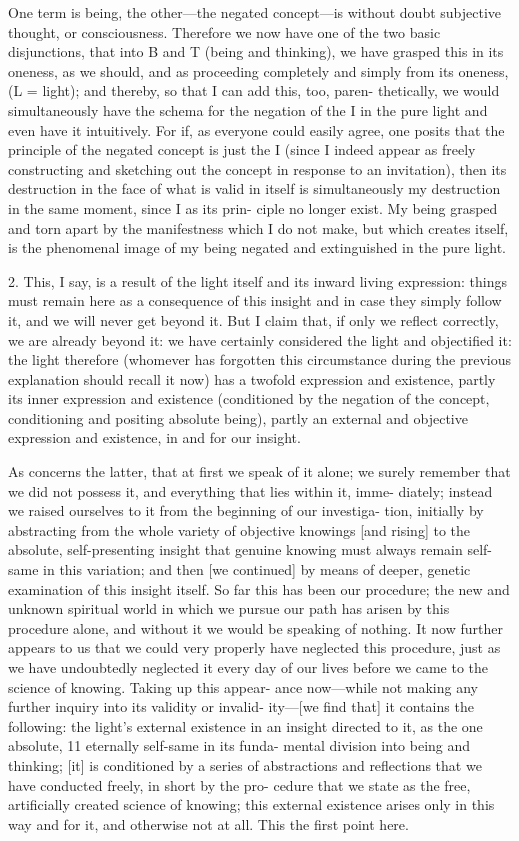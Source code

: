 One term is being, the other—the negated concept—is without doubt
subjective thought, or consciousness.
 Therefore we now have one of the two
basic disjunctions, that into B and T (being and thinking), we have grasped
this in its oneness, as we should, and as proceeding completely and simply
from its oneness, (L = light); and thereby, so that I can add this, too, paren-
thetically, we would simultaneously have the schema for the negation of the I
in the pure light and even have it intuitively.
For if, as everyone could easily agree,
 one posits that the principle of the negated concept is just the I (since
I indeed appear as freely constructing and sketching out the concept in
response to an invitation), then its destruction in the face of what is valid in
itself is simultaneously my destruction in the same moment, since I as its prin-
ciple no longer exist.
 My being grasped and torn apart by the manifestness
which I do not make, but which creates itself, is the phenomenal image of my
being negated and extinguished in the pure light.

2.  This, I say, is a result of the light itself
and its inward living expression:
things must remain here as a consequence of
this insight and in case they simply follow it,
and we will never get beyond it.
But I claim that, if only we reflect correctly,
we are already beyond it:
we have certainly considered the light
and objectified it: the light therefore
(whomever has forgotten this circumstance
during the previous explanation should recall it now)
has a twofold expression and existence,
partly its inner expression and existence
(conditioned by the negation of the concept,
conditioning and positing absolute being),
partly an external and objective expression and existence,
in and for our insight.

As concerns the latter,  that at first we speak of it alone; we surely
remember that we did not possess it, and everything that lies within it, imme-
diately; instead we raised ourselves to it from the beginning of our investiga-
tion, initially by abstracting from the whole variety of objective knowings [and
rising] to the absolute, self-presenting insight that genuine knowing must
always remain self-same in this variation; and then [we continued] by means
of deeper, genetic examination of this insight itself.
So far this has been our
procedure; the new and unknown spiritual world in which we pursue our path
has arisen by this procedure alone, and without it we would be speaking of
nothing.
 It now further appears to us that we could very properly have
neglected this procedure, just as we have undoubtedly neglected it every day
of our lives before we came to the science of knowing.
 Taking up this appear-
ance now—while not making any further inquiry into its validity or invalid-
ity—[we find that] it contains the following: the light’s external existence in
an insight directed to it, as the one absolute, 11 eternally self-same in its funda-
mental division into being and thinking; [it] is conditioned by a series of
abstractions and reflections that we have conducted freely, in short by the pro-
cedure that we state as the free, artificially created science of knowing; this
external existence arises only in this way and for it, and otherwise not at all.
This the first point here.

